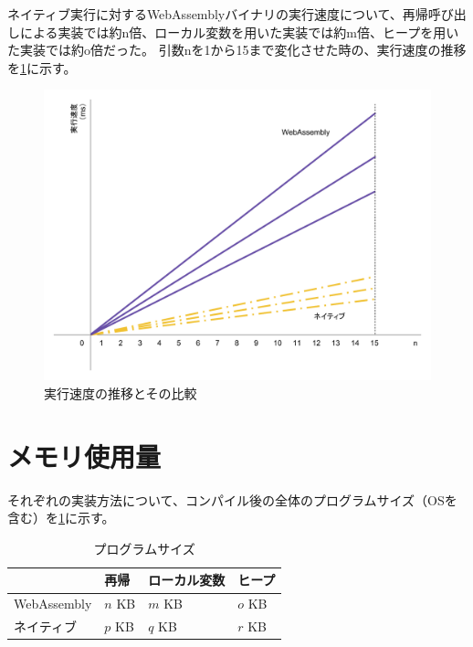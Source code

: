 ネイティブ実行に対するWebAssemblyバイナリの実行速度について、再帰呼び出しによる実装では約n倍、ローカル変数を用いた実装では約m倍、ヒープを用いた実装では約o倍だった。
引数nを1から15まで変化させた時の、実行速度の推移を\ref{fig:exec_time}に示す。

\begin{figure}[htbp]
  \caption{実行速度の推移とその比較}
  \label{fig:exec_time}
  \begin{center}
    \includegraphics[bb=0 0 800 600,width=12cm]{img/exec_time.pdf}
  \end{center}
\end{figure}

\section{メモリ使用量}

それぞれの実装方法について、コンパイル後の全体のプログラムサイズ（OSを含む）を\ref{tb:program_size}に示す。

\begin{table}[]
  \caption{プログラムサイズ}
  \label{tb:program_size}
  \begin{center}
    \begin{tabular}{|l|l|l|l|}
      \hline
      & 再帰 & ローカル変数 & ヒープ \\ \hline
      WebAssembly & $n$ KB & $m$ KB & $o$ KB \\ \hline
      ネイティブ & $p$ KB & $q$ KB & $r$ KB \\ \hline
    \end{tabular}
  \end{center}
\end{table}

